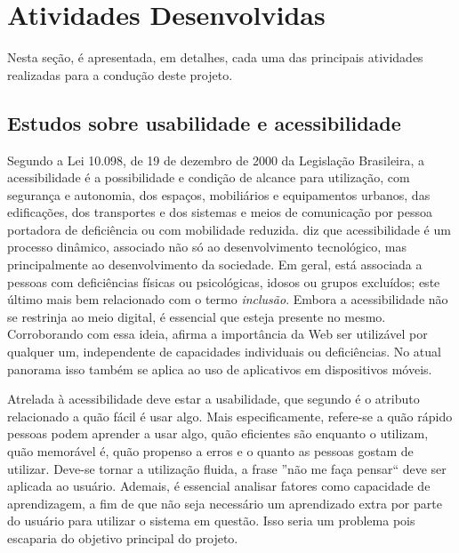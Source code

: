 \chapter{Atividades Desenvolvidas}\label{sec:ativ_desenvolvidas}
Nesta seção, é apresentada, em detalhes, cada uma das principais atividades realizadas para a condução deste projeto.

\section{Estudos sobre usabilidade e acessibilidade}\label{sec:estudos_usab_acess} 



 Segundo a Lei 10.098, de 19 de dezembro de 2000 da Legislação Brasileira, a acessibilidade é a possibilidade e condição de alcance para utilização, com segurança e autonomia, dos
espaços, mobiliários e equipamentos urbanos, das
edificações, dos transportes e dos sistemas e meios de comunicação por pessoa portadora de deficiência ou com mobilidade reduzida. \cite{torres2002acessibilidade} diz que acessibilidade é um processo dinâmico, associado não só ao desenvolvimento tecnológico, mas principalmente ao desenvolvimento da sociedade. Em geral, está associada a pessoas com deficiências físicas ou psicológicas, idosos ou grupos excluídos; este último mais bem relacionado com o termo \textit{inclusão}. Embora a acessibilidade não se restrinja ao meio digital, é essencial que esteja presente no mesmo. Corroborando com essa ideia, \cite{leew3c} afirma a importância da Web ser utilizável por qualquer um, independente de capacidades individuais ou deficiências. No atual panorama isso também se aplica ao uso de aplicativos em dispositivos móveis. 

Atrelada à acessibilidade deve estar a usabilidade, que segundo \cite{nielsenPrioritizingWebUsability}
é o atributo relacionado a quão fácil é usar algo. Mais especificamente, refere-se a quão rápido pessoas podem aprender a usar algo, quão eficientes são enquanto o utilizam, quão memorável é, quão propenso a erros e o quanto as pessoas gostam de utilizar. Deve-se tornar a utilização fluida, a frase ''não me faça pensar`` deve ser aplicada ao usuário.
Ademais, é essencial analisar fatores como capacidade de aprendizagem, a fim de que não seja necessário um aprendizado extra por parte do usuário para utilizar o sistema em questão. Isso seria um problema pois escaparia do objetivo principal do projeto.

